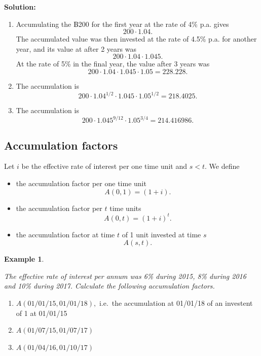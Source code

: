 \documentclass[
]{book}
\theoremstyle{definition}
\theoremstyle{definition}
\newtheorem{example}{Example}[chapter]
\theoremstyle{definition}
\theoremstyle{definition}
\theoremstyle{remark}
\begin{document}
\textbf{Solution:}

\begin{enumerate}
\def\labelenumi{\arabic{enumi}.}
\item
  Accumulating the ฿200 for the first year at the rate of 4\% p.a.
  gives \[200 \cdot 1.04.\] The accumulated value was then invested at
  the rate of 4.5\% p.a. for another year, and its value at after 2
  years was \[200 \cdot 1.04 \cdot 1.045.\] At the rate of 5\% in the
  final year, the value after 3 years was
  \[200 \cdot 1.04 \cdot 1.045 \cdot 1.05 = 228.228.\]
\item
  The accumulation is
  \[200 \cdot 1.04^{1/2} \cdot 1.045 \cdot 1.05^{1/2} = 218.4025.\]
\item
  The accumulation is
  \[200 \cdot 1.045^{9/12} \cdot 1.05^{3/4} = 214.416986.\]
\end{enumerate}

\hypertarget{accumulation-factors}{%
\subsection{Accumulation factors}\label{accumulation-factors}}

Let \(i\) be the effective rate of interest per one time unit and \(s < t\).
We define

\begin{itemize}
\item
  the accumulation factor per one time unit \[A(0,1) = (1 + i).\]
\item
  the accumulation factor per \(t\) time units \[A(0,t) = (1 + i)^t.\]
\item
  the accumulation factor at time \(t\) of 1 unit invested at time \(s\)
  \[A(s,t).\]
\end{itemize}

\begin{example}
\protect\hypertarget{exm:unlabeled-div-20}{}\label{exm:unlabeled-div-20}

\emph{The effective rate of interest per annum was 6\% during 2015, 8\% during
2016 and 10\% during 2017. Calculate the following accumulation factors.}

\begin{enumerate}
\def\labelenumi{\arabic{enumi}.}
\item
  \(A(01/01/15, 01/01/18),\) i.e.~the accumulation at 01/01/18 of an
  investent of 1 at 01/01/15
\item
  \(A(01/07/15, 01/07/17)\)
\item
  \(A(01/04/16, 01/10/17)\)
\end{enumerate}

\end{example}
\end{document}
